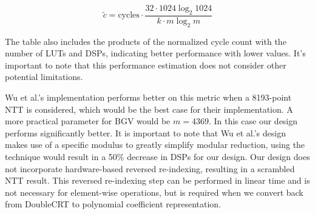 \documentclass[lettersize,journal]{IEEEtran}
\begin{document}
\begin{equation}
\label{eq:norm_cycles}
\tilde{c}=\text{cycles}\cdot\frac{32 \cdot 1024 \log_2 1024}{k \cdot m \log_2 m}
\end{equation}

The table also includes the products of the normalized cycle count with the number of LUTs and DSPs, indicating better performance with lower values. It's important to note that this performance estimation does not consider other potential limitations.

Wu et al.'s implementation performs better on this metric when a 8193-point NTT is considered, which would be the best case for their implementation. A more practical parameter for BGV would be $m=4369$. \cite{9937536} In this case our design performs significantly better. It is important to note that Wu et al.'s design makes use of a specific modulus to greatly simplify modular reduction, using the technique would result in a 50\% decrease in DSPs for our design. Our design does not incorporate hardware-based reversed re-indexing, resulting in a scrambled NTT result. This reversed re-indexing step can be performed in linear time and is not necessary for element-wise operations, but is required when we convert back from DoubleCRT to polynomial coefficient representation.
\end{document}
